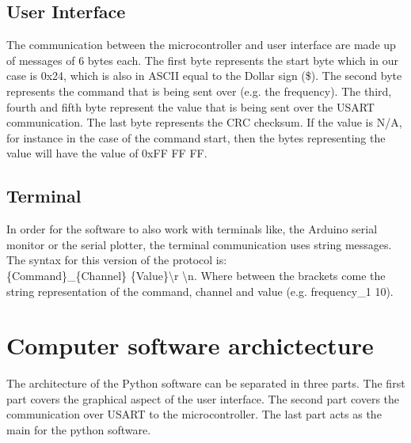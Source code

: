 \documentclass[conference]{IEEEtran}
\begin{document}
\subsection{User Interface}\label{UI_communication}
The communication between the microcontroller and user interface are made up of messages of 6 bytes each. The first byte represents the start byte which in our case is 0x24, which is also in ASCII equal to the Dollar sign (\$). The second byte represents the command that is being sent over (e.g. the frequency). The third, fourth and fifth byte represent the value that is being sent over the USART communication. The last byte represents the CRC checksum. If the value is N/A, for instance in the case of the command start, then the bytes representing the value will have the value of 0xFF FF FF.

\subsection{Terminal}
In order for the software to also work with terminals like, the Arduino serial monitor or the serial plotter, the terminal communication uses string messages. The syntax for this version of the protocol is:
\\ \{Command\}\_\{Channel\} \{Value\}\textbackslash r \textbackslash n. Where between the brackets come the string representation of the command, channel and value (e.g. frequency\_1 10).



\section{Computer software archictecture}

The architecture of the Python software can be separated in three parts. The first part covers the graphical aspect of the user interface. The second part covers the communication over USART to the microcontroller. The last part acts as the main for the python software.
\end{document}
